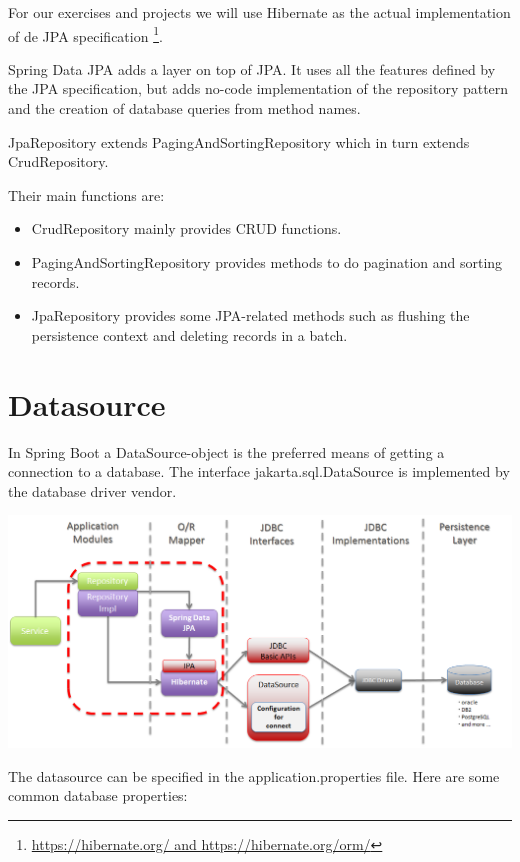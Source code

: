 For our exercises and projects we will use Hibernate as the actual implementation of de JPA specification \footnote{\url{https://hibernate.org/ and https://hibernate.org/orm/}}.  

Spring Data JPA adds a layer on top of JPA. It uses all the features defined by the JPA specification, but adds no-code implementation of the repository pattern and the creation of database queries from method names.

JpaRepository extends PagingAndSortingRepository which in turn extends CrudRepository.

Their main functions are:

\begin{itemize}
\item CrudRepository mainly provides CRUD functions.
\item PagingAndSortingRepository provides methods to do pagination and sorting records.
\item JpaRepository provides some JPA-related methods such as flushing the persistence context and deleting records in a batch.
\end{itemize}


\section{Datasource}

In Spring Boot a DataSource-object is the preferred means of getting a connection to a database.
The interface jakarta.sql.DataSource is implemented by the database driver vendor. 

\includegraphics[width=\textwidth]{./images/chapter-jpa/springdatajpa}

The datasource can be specified in the application.properties file.
Here are some common database properties:

